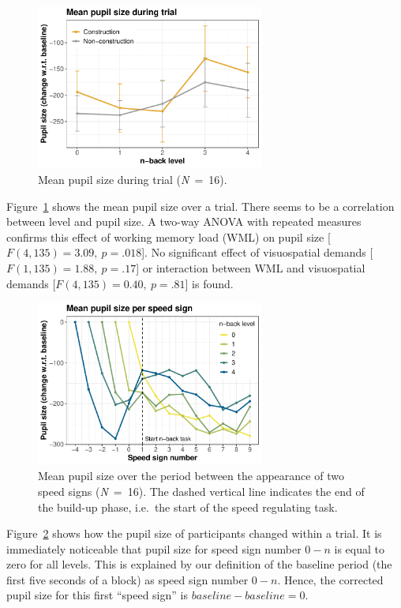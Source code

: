 \begin{figure}
  \centering
  \includegraphics[width=7.5cm]{images/pupil_size_interaction.pdf}
  \caption{Mean pupil size during trial (\textit{N}\ =\ 16).}
  \label{fig:mean-ps}
\end{figure}
Figure~\ref{fig:mean-ps} shows the mean pupil size over a trial. 
There seems to be a correlation between \nback level and pupil size.
A two-way ANOVA with repeated measures confirms this effect of working memory load (WML) on pupil size [\(F(4,135)=3.09,\ p=.018\)].
No significant effect of visuospatial demands [\(F(1,135)=1.88,\ p=.17\)] or interaction between WML and visuospatial demands [\(F(4,135)=0.40,\ p=.81\)] is found.

\begin{figure}
  \centering
  \includegraphics[width=7.5cm]{images/speed_sign_nback.pdf}
  \caption{Mean pupil size over the period between the appearance of two speed signs (\textit{N}\ =\ 16).
  The dashed vertical line indicates the end of the build-up phase, i.e.\ the start of the speed regulating task.}
  \label{fig:ps-speed-sign}    
\end{figure}

Figure~\ref{fig:ps-speed-sign} shows how the pupil size of participants changed within a trial.
It is immediately noticeable that pupil size for speed sign number \(0-n\) is equal to zero for all \nback levels.
This is explained by our definition of the baseline period (the first five seconds of a block) as speed sign number \(0-n\).
Hence, the corrected pupil size for this first ``speed sign'' is \(baseline-baseline=0\).

